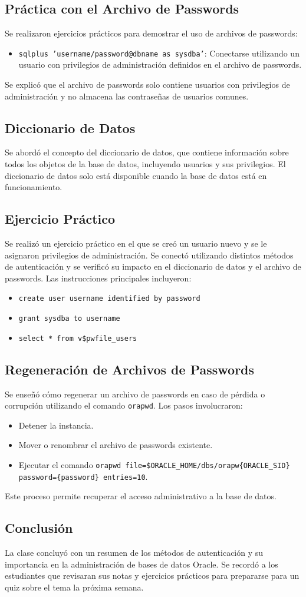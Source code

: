 \documentclass[12pt]{article}
\begin{document}
\subsection*{Práctica con el Archivo de Passwords}
Se realizaron ejercicios prácticos para demostrar el uso de archivos de passwords:
\begin{itemize}
    \item \texttt{sqlplus 'username/password@dbname as sysdba'}: Conectarse utilizando un usuario con privilegios de administración definidos en el archivo de passwords.
\end{itemize}
Se explicó que el archivo de passwords solo contiene usuarios con privilegios de administración y no almacena las contraseñas de usuarios comunes.

\subsection*{Diccionario de Datos}
Se abordó el concepto del diccionario de datos, que contiene información sobre todos los objetos de la base de datos, incluyendo usuarios y sus privilegios. El diccionario de datos solo está disponible cuando la base de datos está en funcionamiento.

\subsection*{Ejercicio Práctico}
Se realizó un ejercicio práctico en el que se creó un usuario nuevo y se le asignaron privilegios de administración. Se conectó utilizando distintos métodos de autenticación y se verificó su impacto en el diccionario de datos y el archivo de passwords. Las instrucciones principales incluyeron:
\begin{itemize}
    \item \texttt{create user username identified by password}
    \item \texttt{grant sysdba to username}
    \item \texttt{select * from v\$pwfile\_users}
\end{itemize}

\subsection*{Regeneración de Archivos de Passwords}
Se enseñó cómo regenerar un archivo de passwords en caso de pérdida o corrupción utilizando el comando \texttt{orapwd}. Los pasos involucraron:
\begin{itemize}
    \item Detener la instancia.
    \item Mover o renombrar el archivo de passwords existente.
    \item Ejecutar el comando \texttt{orapwd file=\$ORACLE\_HOME/dbs/orapw\{ORACLE\_SID\} password=\{password\} entries=10}.
\end{itemize}
Este proceso permite recuperar el acceso administrativo a la base de datos.

\subsection*{Conclusión}
La clase concluyó con un resumen de los métodos de autenticación y su importancia en la administración de bases de datos Oracle. Se recordó a los estudiantes que revisaran sus notas y ejercicios prácticos para prepararse para un quiz sobre el tema la próxima semana.
\end{document}
